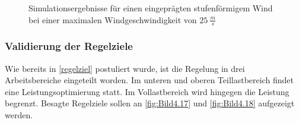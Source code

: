 \begin{figure}[H]
   \centering
   \caption[Simulationsergebnisse bei stufenförmigem Wind]{Simulationsergebnisse für einen eingeprägten stufenförmigem Wind bei einer maximalen Windgeschwindigkeit von $\SI{25}{\frac{m}{s}}$}
   \label{fig:Bild4.16}
\end{figure}

\subsubsection{Validierung der Regelziele}

Wie bereits in \autoref{regelziel} postuliert wurde, ist die Regelung in drei Arbeitsbereiche eingeteilt worden. Im unteren und oberen Teillastbereich findet eine Leistungsoptimierung statt. Im Vollastbereich wird hingegen die Leistung begrenzt. Besagte Regelziele sollen an \autoref{fig:Bild4.17} und \autoref{fig:Bild4.18} aufgezeigt werden.\\

